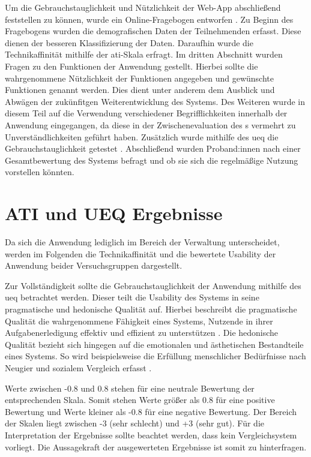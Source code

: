 Um die Gebrauchstauglichkeit und Nützlichkeit der Web-App abschließend
feststellen zu können, wurde ein Online-Fragebogen entworfen . Zu Beginn des Fragebogens wurden die demografischen Daten der
Teilnehmenden erfasst. Diese dienen der besseren Klassifizierung der Daten.
Daraufhin wurde die Technikaffinität mithilfe der \ac{ati}-Skala erfragt. Im
dritten Abschnitt wurden Fragen zu den Funktionen der Anwendung gestellt.
Hierbei sollte die wahrgenommene Nützlichkeit der Funktionen angegeben und
gewünschte Funktionen genannt werden. Dies dient unter anderem dem Ausblick und
Abwägen der zukünfitgen Weiterentwicklung des Systems. Des Weiteren wurde in
diesem Teil auf die Verwendung verschiedener Begrifflichkeiten innerhalb der
Anwendung eingegangen, da diese in der Zwischenevaluation des
s vermehrt zu Unverständlichkeiten geführt haben.
Zusätzlich wurde mithilfe des \ac{ueq} die Gebrauchstauglichkeit getestet
\cite{burghardt_mensch_2018}. Abschließend wurden Proband:innen nach einer
Gesamtbewertung des Systems befragt und ob sie sich die regelmäßige Nutzung
vorstellen könnten.



\section{ATI und UEQ Ergebnisse}
Da sich die Anwendung lediglich im Bereich der Verwaltung unterscheidet, werden im
Folgenden die Technikaffinität und die bewertete Usability der Anwendung beider
Versuchsgruppen dargestellt.

Zur Vollständigkeit sollte die Gebrauchstauglichkeit der Anwendung mithilfe des \ac{ueq} betrachtet
werden. Dieser teilt die Usability des Systems in seine pragmatische und hedonische Qualität auf.
Hierbei beschreibt die pragmatische Qualität die wahrgenommene Fähigkeit eines Systems, Nutzende in
ihrer Aufgabenerledigung effektiv und effizient zu unterstützen \cite{hassenzahl_thing_2004}. Die
hedonische Qualität bezieht sich hingegen auf die emotionalen und ästhetischen Bestandteile eines
Systems. So wird beispielsweise die Erfüllung menschlicher Bedürfnisse nach Neugier und sozialem
Vergleich erfasst \cite{hassenzahl_thing_2004}.

Werte zwischen -0.8 und 0.8 stehen für eine neutrale Bewertung der entsprechenden Skala. Somit
stehen Werte größer als 0.8 für eine positive Bewertung und Werte kleiner als -0.8 für eine negative
Bewertung. Der Bereich der Skalen liegt zwischen -3 (sehr schlecht) und +3 (sehr gut). Für die
Interpretation der Ergebnisse sollte beachtet werden, dass kein Vergleichsystem vorliegt. Die
Aussagekraft der ausgewerteten Ergebnisse ist somit zu hinterfragen.

